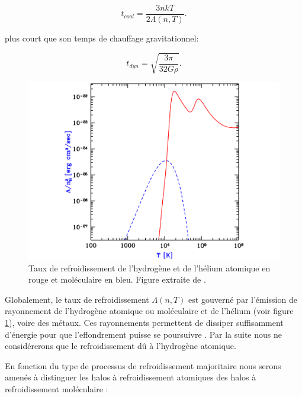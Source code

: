 \begin{equation}
t_{cool} = \frac{3 nkT}{2 \Lambda(n,T)}.
\end{equation}

plus court que son temps de chauffage gravitationnel:

\begin{equation}
t_{dyn} =\sqrt{\frac{3 \pi}{32 G \rho}}.
\end{equation}




\begin{figure}
        \includegraphics[width=.95\linewidth]{img/01/fonction_refroidissement.pdf} 
        \caption[Fonction de refroidissement]{Taux de refroidissement de l'hydrogène et de l'hélium atomique en rouge et moléculaire en bleu. 
        Figure extraite de \cite{2016PhR...645....1B}.
 		\label{fig:refroidissement}}
\end{figure}

Globalement, le taux de refroidissement $\Lambda(n,T)$ est gouverné par l'émission de rayonnement de l'hydrogène atomique ou moléculaire et de l’hélium (voir figure \ref{fig:refroidissement}), voire des métaux.
Ces rayonnements permettent de dissiper suffisamment d'énergie pour que l'effondrement puisse se poursuivre \citep{2001PhR...349..125B}.
Par la suite nous ne considérerons que le refroidissement dû à l'hydrogène atomique.

En fonction du type de processus de refroidissement majoritaire nous serons amenés à distinguer les halos à refroidissement atomiques des halos à refroidissement moléculaire \citep{2002Sci...295...93A}:

